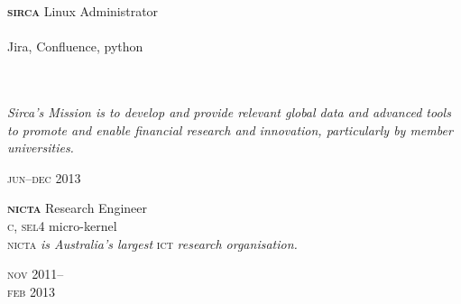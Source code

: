 \begin{minipage}[t]{0.7\textwidth}
\textbf{\textsc{sirca}}\phantom{..} Linux Administrator \\
\\
Jira, Confluence, python
\\
\\
\\
{\small
\textit{Sirca’s Mission is to develop and provide relevant global data and advanced tools to promote and enable financial research and innovation, particularly by member universities.}
\par}
\end{minipage}
\begin{minipage}[t]{0.3\textwidth}
\hfill \textsc{jun}--\textsc{dec} 2013\\
\end{minipage}

\vspace{0.2in}

\begin{minipage}[t]{0.75\textwidth}
\textbf{\textsc{nicta}}\phantom{..} Research Engineer \\
\textsc{c}, \textsc{sel4} micro-kernel \\
{\small
\textsc{nicta}\textit{ is Australia's largest} \textsc{ict} \textit{research organisation.}
}
\end{minipage}
\begin{minipage}[t]{0.25\textwidth}
{
\hfill \textsc{nov} 2011--\\ 
\hspace*{0pt} \hfill \textsc{feb} 2013
\par
}
\end{minipage}







